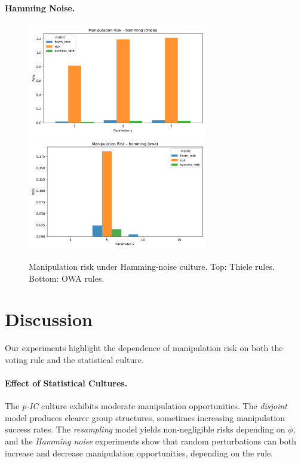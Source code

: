 \documentclass[11pt]{article}
\begin{document}
\paragraph{Hamming Noise.}
\begin{figure}[h!]
\centering
\includegraphics[width=0.7\textwidth]{figures/risk_hamming_thiele.pdf}
\includegraphics[width=0.7\textwidth]{figures/risk_hamming_owa.pdf}
\caption{Manipulation risk under Hamming-noise culture. Top: Thiele rules. Bottom: OWA rules.}
\end{figure}

\section{Discussion}
Our experiments highlight the dependence of manipulation risk on both the
voting rule and the statistical culture.

\paragraph{Effect of Statistical Cultures.}
The \emph{p-IC} culture exhibits moderate manipulation opportunities.
The \emph{disjoint} model produces clearer group structures, sometimes
increasing manipulation success rates. The \emph{resampling} model yields
non-negligible risks depending on $\phi$, and the \emph{Hamming noise}
experiments show that random perturbations can both increase and decrease
manipulation opportunities, depending on the rule.
\end{document}
